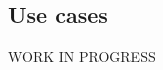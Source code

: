\documentclass[11pt,letterpaper]{article}
\begin{document}
\subsection{Use cases}
WORK IN PROGRESS

\end{document}
